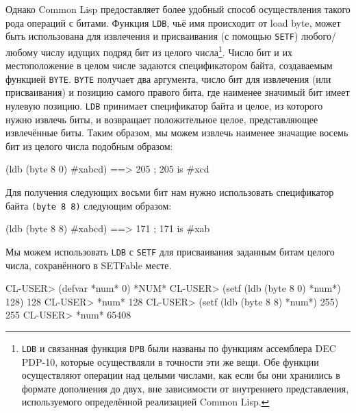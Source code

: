 Однако Common Lisp предоставляет более удобный способ осуществления такого рода операций
с битами. Функция \lstinline{LDB}, чьё имя происходит от load byte, может быть использована
для извлечения и присваивания (с помощью \lstinline{SETF}) любого/любому числу идущих подряд
бит из целого числа\footnote{\lstinline{LDB} и связанная функция \lstinline{DPB} были названы по
  функциям ассемблера DEC PDP-10, которые осуществляли в точности эти же вещи. Обе функции
  осуществляют операции над целыми числами, как если бы они хранились в формате дополнения
  до двух, вне зависимости от внутреннего представления, используемого определённой
  реализацией Common Lisp.}\hspace{\footnotenegspace}. Число бит и их местоположение в целом числе задаются
спецификатором байта, создаваемым функцией \lstinline{BYTE}. \lstinline{BYTE} получает два
аргумента, число бит для извлечения (или присваивания) и позицию самого правого бита, где
наименее значимый бит имеет нулевую позицию. \lstinline{LDB} принимает спецификатор байта и
целое, из которого нужно извлечь биты, и возвращает положительное целое, представляющее
извлечённые биты. Таким образом, мы можем извлечь наименее значащие восемь бит из целого
числа подобным образом:

\begin{myverb}
(ldb (byte 8 0) #xabcd) ==> 205 ; 205 is #xcd
\end{myverb}

Для получения следующих восьми бит нам нужно использовать спецификатор байта
\lstinline{(byte 8 8)} следующим образом:

\begin{myverb}
(ldb (byte 8 8) #xabcd) ==> 171 ; 171 is #xab
\end{myverb}

Мы можем использовать \lstinline{LDB} с \lstinline{SETF} для присваивания заданным битам целого
числа, сохранённого в SETFable месте.

\begin{myverb}
CL-USER> (defvar *num* 0)
*NUM*
CL-USER> (setf (ldb (byte 8 0) *num*) 128)
128
CL-USER> *num*
128
CL-USER> (setf (ldb (byte 8 8) *num*) 255)
255
CL-USER> *num*
65408
\end{myverb}

